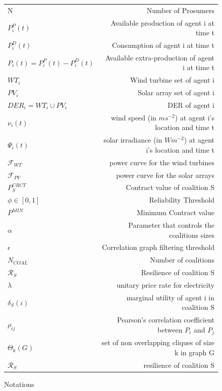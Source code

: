 \documentclass[journal]{IEEEtran}
\begin{document}
\begin{figure}
\begin{minipage}{\textwidth}
\centering
	\begin{tabular}{ | l | r | }
   						N & Number of Prosumers \\
   						$ P_i^P(t) $ & Available production of agent i at time t \\
   						$ P_i^D(t) $ & Consumption of agent i at time t \\ 
  						$ P_i(t) = P_i^P(t) - P_i^D(t) $ & Available extra-production of agent i at time t \\
  						$  WT_i $ & Wind turbine set of agent i \\
  						$ PV_i $ & Solar array set of agent i \\
  						$ DER_i = WT_i \cup PV_i $ & DER of agent i \\
  						$ \nu_i(t) $ & wind speed (in $ m s^{-2} $) at agent i's location and time t \\
  						$ \Psi_i(t) $ & solar irradiance (in $ W m^{-2} $) at agent i's location and time t \\
  						$ \mathcal{F}_{WT} $ & power curve for the wind turbines \\
  						$ \mathcal{F}_{PV} $ & power curve for the solar arrays \\
   						$ P_S^{CRCT} $ & Contract value of coalition S \\
   						$ \phi \in \left[ 0,1 \right] $ & Reliability Threshold \\
   						$ P^{MIN} $ & Minimum Contract value \\
   						$ \alpha $ & Parameter that controls the coalitions sizes \\
   						$ \epsilon $ & Correlation graph filtering threshold \\
   						$ N_{COAL} $ & Number of coalitions \\
   						$ \mathcal{R}_S $ & Resilience of coalition S \\
   						$ \lambda $ & unitary price rate for electricity \\
   						$ \delta_S(i) $ & marginal utility of agent i in coalition S \\
   						$ \rho_{ij} $ & Pearson's correlation coefficient between $ P_i$ and $P_j$ \\
   						$ \Theta_k(G) $ & set of non overlapping cliques of size k in graph G \\
   						$ \mathcal{R}_S $ & resilience of coalition S
 	\end{tabular}
 
\end{minipage}
\caption{Notations}
\label{fig:notations}
\end{figure}
\end{document}
